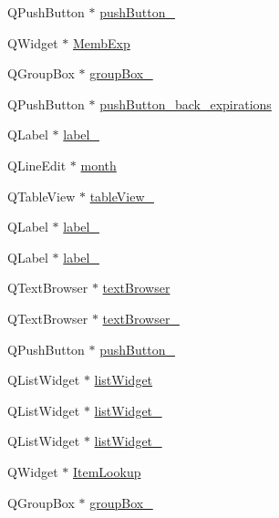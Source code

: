 \begin{DoxyCompactItemize}
Q\+Push\+Button $\ast$ \hyperlink{class_ui___main_window_a40bed0eec496bb29f08278e2f31d0ca0}{push\+Button\+\_}
\item 
Q\+Widget $\ast$ \hyperlink{class_ui___main_window_aea0b4e81db4717a61137fdce134c5f1a}{Memb\+Exp}
\item 
Q\+Group\+Box $\ast$ \hyperlink{class_ui___main_window_a417cb0342ea95d3fe5f7e3f4feeb6515}{group\+Box\+\_}
\item 
Q\+Push\+Button $\ast$ \hyperlink{class_ui___main_window_ae68303eadec2dca0051594cd8a57a6de}{push\+Button\+\_\+back\+\_\+expirations}
\item 
Q\+Label $\ast$ \hyperlink{class_ui___main_window_a55100f53189f25cf8a1ee0beb29be642}{label\+\_}
\item 
Q\+Line\+Edit $\ast$ \hyperlink{class_ui___main_window_aa1ecbd50132502a4ee4c10e05f61ac52}{month}
\item 
Q\+Table\+View $\ast$ \hyperlink{class_ui___main_window_ae0da2244d97082fa61a1c43784057484}{table\+View\+\_}
\item 
Q\+Label $\ast$ \hyperlink{class_ui___main_window_ad0a5580e9e7432ed041d6c2d587cd13e}{label\+\_}
\item 
Q\+Label $\ast$ \hyperlink{class_ui___main_window_a9125c3f58951f983d461686ccaabb468}{label\+\_}
\item 
Q\+Text\+Browser $\ast$ \hyperlink{class_ui___main_window_a2c789c07fa5fc1cee05aae8df52bb02d}{text\+Browser}
\item 
Q\+Text\+Browser $\ast$ \hyperlink{class_ui___main_window_a5bec2635005eda0e4928c870c913ac3d}{text\+Browser\+\_}
\item 
Q\+Push\+Button $\ast$ \hyperlink{class_ui___main_window_abd490d0a83a2158343b3f24684071cf1}{push\+Button\+\_}
\item 
Q\+List\+Widget $\ast$ \hyperlink{class_ui___main_window_ae647a15635ba8a0e5d5aec475db99d8f}{list\+Widget}
\item 
Q\+List\+Widget $\ast$ \hyperlink{class_ui___main_window_a2b6d9b1c99c000be1ee90efd42ab8e2e}{list\+Widget\+\_}
\item 
Q\+List\+Widget $\ast$ \hyperlink{class_ui___main_window_a6d9544c75d9bed4d8040356e27a16f2f}{list\+Widget\+\_}
\item 
Q\+Widget $\ast$ \hyperlink{class_ui___main_window_a8e082fa9dfeb1caebb9275b6f315f60b}{Item\+Lookup}
\item 
Q\+Group\+Box $\ast$ \hyperlink{class_ui___main_window_af55cd87dbe0f7d42980b1012f15cae2d}{group\+Box\+\_}
\item 

\end{DoxyCompactItemize}

